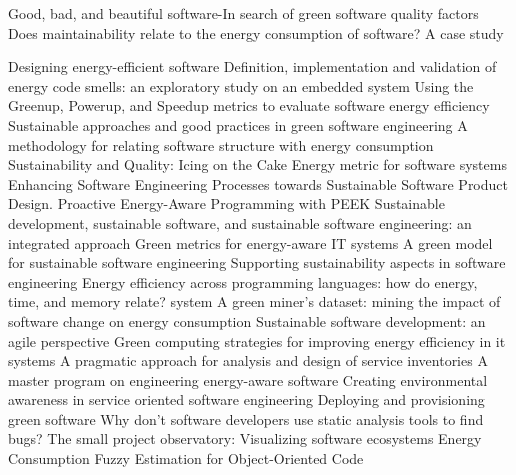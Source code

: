 \citep{Taina2011} Good, bad, and beautiful software-In search of green software quality factors
\citep{Mancebo2021} Does maintainability relate to the energy consumption of software? A case study

\citep{Sivasubramaniam2002} Designing energy-efficient software
\citep{Vetro2013} Definition, implementation and validation of energy code smells: an exploratory study on an embedded system
\citep{Abdulsalam2015} Using the Greenup, Powerup, and Speedup metrics to evaluate software energy efficiency
\citep{Agarwal2012} Sustainable approaches and good practices in green software engineering
\citep{Bangash2017} A methodology for relating software structure with energy consumption
\citep{Calero2013a} Sustainability and Quality: Icing on the Cake
\citep{Chatzigeorgiou2002} Energy metric for software systems
\citep{Dick2010a} Enhancing Software Engineering Processes towards Sustainable Software Product Design.
\citep{Honig2014} Proactive Energy-Aware Programming with PEEK
\citep{Johann2011} Sustainable development, sustainable software, and sustainable software engineering: an integrated approach
\citep{Kipp2011} Green metrics for energy-aware IT systems
\citep{Mahmoud2013} A green model for sustainable software engineering
\citep{Penzenstadler2012a} Supporting sustainability aspects in software engineering
\citep{Pereira2017a} Energy efficiency across programming languages: how do energy, time, and memory relate?
system
\citep{Zhang2014a} A green miner's dataset: mining the impact of software change on energy consumption
\citep{Tate2005} Sustainable software development: an agile perspective
\citep{John2014} Green computing strategies for improving energy efficiency in it systems
\citep{Lago2012} A pragmatic approach for analysis and design of service inventories
\citep{Lago2015b} A master program on engineering energy-aware software
\citep{Lago2011} Creating environmental awareness in service oriented software engineering
\citep{Bener2014} Deploying and provisioning green software
\citep{Johnson2013} Why don't software developers use static analysis tools to find bugs?
\citep{Lungu2010} The small project observatory: Visualizing software ecosystems
\citep{Liu2018a} Energy Consumption Fuzzy Estimation for Object-Oriented Code

